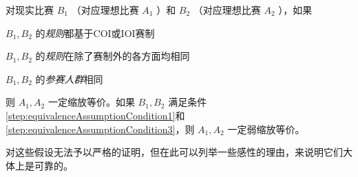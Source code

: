         \begin{assumption}
            对现实比赛 $B_1$ （对应理想比赛 $A_1$ ）和 $B_2$ （对应理想比赛 $A_2$ ），如果
            \begin{asparaenum}
                \item \label{step:equivalenceAssumptionCondition1} $B_1,B_2$ 的\emph{规则}都基于COI或IOI赛制
                \item \label{step:equivalenceAssumptionCondition2} $B_1,B_2$ 的\emph{规则}在除了赛制外的各方面均相同
                \item \label{step:equivalenceAssumptionCondition3} $B_1,B_2$ 的\emph{参赛人群}相同
            \end{asparaenum}

            则 $A_1,A_2$ 一定缩放等价。如果 $B_1,B_2$ 满足条件\ref{step:equivalenceAssumptionCondition1}和\ref{step:equivalenceAssumptionCondition3}，则 $A_1,A_2$ 一定弱缩放等价。

            \label{ass:equivalenceBetweenCodingContests}
        \end{assumption}

        对这些假设无法予以严格的证明，但在此可以列举一些感性的理由，来说明它们大体上是可靠的。

